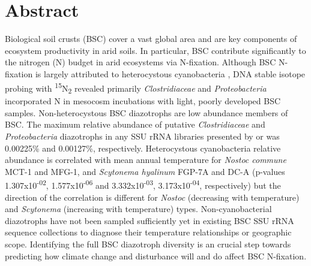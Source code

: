 \section{Abstract}
Biological soil crusts (BSC) cover a vast global area and are key components of ecosystem productivity in arid soils. In particular, BSC contribute significantly to the nitrogen (N) budget in arid ecosystems via N-fixation. Although BSC N-fixation is largely attributed to heterocystous cyanobacteria \citep{Yeager, 14766579, Yeager_2012}, DNA stable isotope probing with \textsuperscript{15}N\textsubscript{2} revealed primarily \textit{Clostridiaceae} and \textit{Proteobacteria} incorporated N in mesocosm incubations with light, poorly developed BSC samples. Non-heterocystous BSC diazotrophs are low abundance members of BSC. The maximum relative abundance of putative \textit{Clostridiaceae} and \textit{Proteobacteria} diazotrophs in any SSU rRNA libraries presented by \citet{Garcia_Pichel_2013} or \citet{Steven_2013} was 0.00225\% and 0.00127\%, respectively. Heterocystous cyanobacteria relative abundance is correlated with mean annual temperature for \textit{Nostoc commune} MCT-1 and MFG-1, and \textit{Scytonema hyalinum} FGP-7A and DC-A (p-values 1.307x10\textsuperscript{-02}, 1.577x10\textsuperscript{-06} and 3.332x10\textsuperscript{-03}, 3.173x10\textsuperscript{-04}, respectively) but the direction of the correlation is different for \textit{Nostoc} (decreasing with temperature) and \textit{Scytonema} (increasing with temperature) types. Non-cyanobacterial diazotrophs have not been sampled sufficiently yet in existing BSC SSU rRNA sequence collections to diagnose their temperature relationships or geographic scope. Identifying the full BSC diazotroph diversity is an crucial step towards predicting how climate change and disturbance will and do affect BSC N-fixation.
